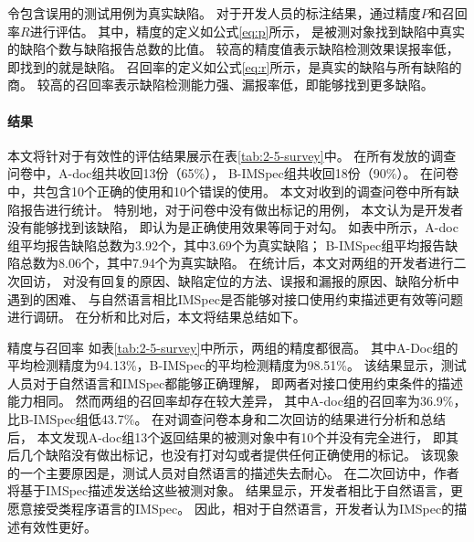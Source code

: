 令包含误用的测试用例为真实缺陷。
对于开发人员的标注结果，通过精度$P$和召回率$R$进行评估。
其中，精度的定义如公式\ref{eq:p}所示，
是被测对象找到缺陷中真实的缺陷个数与缺陷报告总数的比值。
较高的精度值表示缺陷检测效果误报率低，即找到的就是缺陷。
召回率的定义如公式\ref{eq:r}所示，是真实的缺陷与所有缺陷的商。
较高的召回率表示缺陷检测能力强、漏报率低，即能够找到更多缺陷。




\paragraph{结果}
本文将针对于有效性的评估结果展示在表\ref{tab:2-5-survey}中。
在所有发放的调查问卷中，A-doc组共收回13份（65\%），
B-IMSpec组共收回18份（90\%）。
在问卷中，共包含10个正确的使用和10个错误的使用。
本文对收到的调查问卷中所有缺陷报告进行统计。
特别地，对于问卷中没有做出标记的用例，
本文认为是开发者没有能够找到该缺陷，
即认为是正确使用效果等同于对勾。
如表中所示，A-doc组平均报告缺陷总数为3.92个，其中3.69个为真实缺陷；
B-IMSpec组平均报告缺陷总数为8.06个，其中7.94个为真实缺陷。
在统计后，本文对两组的开发者进行二次回访，
对没有回复的原因、缺陷定位的方法、误报和漏报的原因、缺陷分析中遇到的困难、
与自然语言相比IMSpec是否能够对接口使用约束描述更有效等问题进行调研。
在分析和比对后，本文将结果总结如下。

{\kaishu 精度与召回率 }
如表\ref{tab:2-5-survey}中所示，两组的精度都很高。
其中A-Doc组的平均检测精度为94.13\%，B-IMSpec的平均检测精度为98.51\%。
该结果显示，测试人员对于自然语言和IMSpec都能够正确理解，
即两者对接口使用约束条件的描述能力相同。
然而两组的召回率却存在较大差异，
其中A-doc组的召回率为36.9\%，比B-IMSpec组低43.7\%。
在对调查问卷本身和二次回访的结果进行分析和总结后，
本文发现A-doc组13个返回结果的被测对象中有10个并没有完全进行，
即其后几个缺陷没有做出标记，也没有打对勾或者提供任何正确使用的标记。
该现象的一个主要原因是，测试人员对自然语言的描述失去耐心。
在二次回访中，作者将基于IMSpec描述发送给这些被测对象。
结果显示，开发者相比于自然语言，更愿意接受类程序语言的IMSpec。
因此，相对于自然语言，开发者认为IMSpec的描述有效性更好。
	
